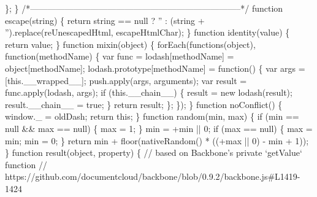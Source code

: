 \begin{DoxyCodeInclude}
{{\textcolor{stringliteral}{    \};}
\textcolor{stringliteral}{  \}}
\textcolor{stringliteral}{}
\textcolor{stringliteral}{  /*--------------------------------------------------------------------------*/}
\textcolor{stringliteral}{}
\textcolor{stringliteral}{  function escape(string) \{}
\textcolor{stringliteral}{    return string == null ? '' : (string + '').replace(reUnescapedHtml, escapeHtmlChar);}
\textcolor{stringliteral}{  \}}
\textcolor{stringliteral}{}
\textcolor{stringliteral}{  function identity(value) \{}
\textcolor{stringliteral}{    return value;}
\textcolor{stringliteral}{  \}}
\textcolor{stringliteral}{}
\textcolor{stringliteral}{  function mixin(object) \{}
\textcolor{stringliteral}{    forEach(functions(object), function(methodName) \{}
\textcolor{stringliteral}{      var func = lodash[methodName] = object[methodName];}
\textcolor{stringliteral}{}
\textcolor{stringliteral}{      lodash.prototype[methodName] = function() \{}
\textcolor{stringliteral}{        var args = [this.\_\_wrapped\_\_];}
\textcolor{stringliteral}{        push.apply(args, arguments);}
\textcolor{stringliteral}{}
\textcolor{stringliteral}{        var result = func.apply(lodash, args);}
\textcolor{stringliteral}{        if (this.\_\_chain\_\_) \{}
\textcolor{stringliteral}{          result = new lodash(result);}
\textcolor{stringliteral}{          result.\_\_chain\_\_ = true;}
\textcolor{stringliteral}{        \}}
\textcolor{stringliteral}{        return result;}
\textcolor{stringliteral}{      \};}
\textcolor{stringliteral}{    \});}
\textcolor{stringliteral}{  \}}
\textcolor{stringliteral}{}
\textcolor{stringliteral}{  function noConflict() \{}
\textcolor{stringliteral}{    window.\_ = oldDash;}
\textcolor{stringliteral}{    return this;}
\textcolor{stringliteral}{  \}}
\textcolor{stringliteral}{}
\textcolor{stringliteral}{  function random(min, max) \{}
\textcolor{stringliteral}{    if (min == null && max == null) \{}
\textcolor{stringliteral}{      max = 1;}
\textcolor{stringliteral}{    \}}
\textcolor{stringliteral}{    min = +min || 0;}
\textcolor{stringliteral}{    if (max == null) \{}
\textcolor{stringliteral}{      max = min;}
\textcolor{stringliteral}{      min = 0;}
\textcolor{stringliteral}{    \}}
\textcolor{stringliteral}{    return min + floor(nativeRandom() * ((+max || 0) - min + 1));}
\textcolor{stringliteral}{  \}}
\textcolor{stringliteral}{}
\textcolor{stringliteral}{  function result(object, property) \{}
\textcolor{stringliteral}{    // based on Backbone's private `getValue` function}
\textcolor{stringliteral}{    // https://github.com/documentcloud/backbone/blob/0.9.2/backbone.js#L1419-1424}
}}
\end{DoxyCodeInclude}
